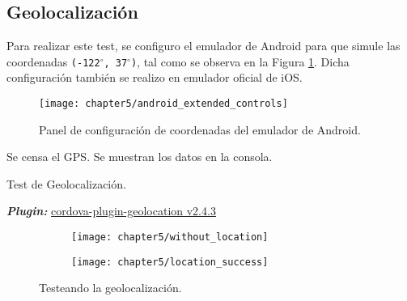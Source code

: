 \subsection{Geolocalización}
Para realizar este test, se configuro el emulador de Android para que simule las coordenadas \texttt{(-122$^\circ$, 37$^\circ$)}, tal como se observa en la Figura \ref{fig:ch05:android_extended_controls}. Dicha configuración también se realizo en emulador oficial de iOS.\\
\begin{figure}[hbtp]
    \centering
	\texttt{[image: chapter5/android\_extended\_controls]}
	\caption{Panel de configuración de coordenadas del emulador de Android.}
	\label{fig:ch05:android_extended_controls}
\end{figure}
\begin{algorithm}
	\begin{algorithmic}[1]
		\STATE Se censa el GPS.
		\STATE Se muestran los datos en la consola.
	\end{algorithmic}
	\caption{Test de Geolocalización.}\label{alg:chap5:test_geolocalizacion}
\end{algorithm}
\textbf{\emph{Plugin:}} \href{https://github.com/apache/cordova-plugin-geolocation}{cordova-plugin-geolocation v2.4.3}
\begin{figure}[hbtp]
    \centering
	\begin{subfigure}{0.3\linewidth}
		\texttt{[image: chapter5/without\_location]}
		\label{fig:ch05:without_location}
	\end{subfigure}
	\begin{subfigure}{0.3\linewidth}
		\texttt{[image: chapter5/location\_success]}
		\label{fig:ch05:with_location}
	\end{subfigure}
	\caption{Testeando la geolocalización.}
	\label{fig:ch05:geolocation-cases}
\end{figure}
\newpage
